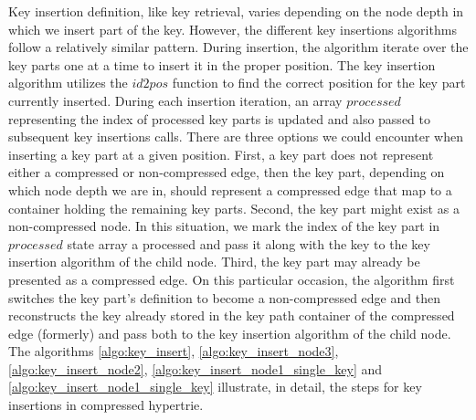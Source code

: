  Key insertion definition, like key retrieval, varies depending on the node depth in which we insert part of the key. However, the different key insertions algorithms follow a relatively similar pattern. During insertion, the algorithm iterate over the key parts one at a time to insert it in the proper position. The key insertion algorithm utilizes the $id2pos$ function to find the correct position for the key part currently inserted. During each insertion iteration, an array $processed$ representing the index of processed key parts is updated and also passed to subsequent key insertions calls. There are three options we could encounter when inserting a key part at a given position. First, a key part does not represent either a compressed or non-compressed edge, then the key part, depending on which node depth we are in, should represent a compressed edge that map to a container holding the remaining key parts. Second, the key part might exist as a non-compressed node. In this situation, we mark the index of the key part in $processed$ state array a processed and pass it along with the key to the key insertion algorithm of the child node. Third, the key part may already be presented as a compressed edge. On this particular occasion, the algorithm first switches the key part's definition to become a non-compressed edge and then reconstructs the key already stored in the key path container of the compressed edge (formerly) and pass both to the key insertion algorithm of the child node. The algorithms \ref{algo:key_insert}, \ref{algo:key_insert_node3}, \ref{algo:key_insert_node2}, \ref{algo:key_insert_node1_single_key} and \ref{algo:key_insert_node1_single_key} illustrate, in detail, the steps for key insertions in compressed hypertrie.

